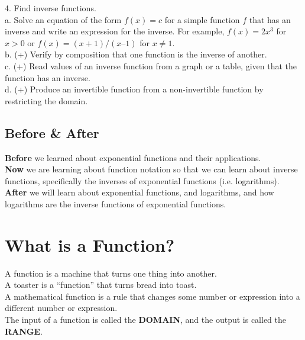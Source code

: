 \documentclass[12pt]{article}
\let\stdsection\section
\renewcommand\section{\newpage\stdsection}
\begin{document}
4. Find inverse functions.\\

a. Solve an equation of the form $f(x) = c$ for a simple function $f$
that has an inverse and write an expression for the inverse. For
example, $f(x) =2 x^3$ for $x > 0$ or $f(x) = (x+1)/(x–1)$ for $x ≠ 1$.\\

b. (+) Verify by composition that one function is the inverse of
another.\\

c. (+) Read values of an inverse function from a graph or a table,
given that the function has an inverse.\\

d. (+) Produce an invertible function from a non-invertible function
by restricting the domain.\\



\subsection{Before \& After}

\textbf{Before} we learned about exponential functions and their applications.\\

\textbf{Now} we are learning about function notation so that we can learn about inverse functions, specifically the inverses of exponential functions (i.e. logarithms).\\

\textbf{After} we will learn about exponential functions, and logarithms, and how logarithms are the inverse functions of exponential functions. 



\section{What is a Function?}

A function is a machine that turns one thing into another. \\

A toaster is a ``function'' that turns bread into toast.\\

A mathematical function is a rule that changes some number or expression into a different number or expression.\\

The input of a function is called the \textbf{DOMAIN}, and the output is called the \textbf{RANGE}.\\
\end{document}
